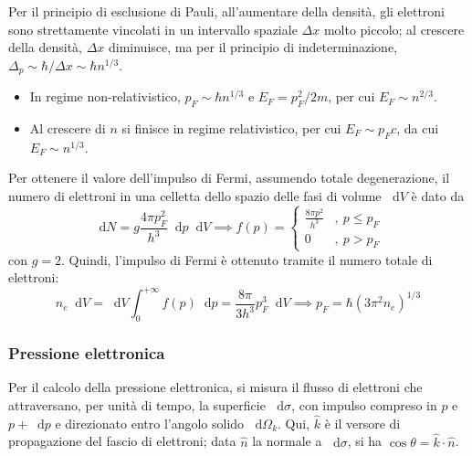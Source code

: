 \documentclass[11pt, a4paper]{scrartcl}
\theoremstyle{style}
\theoremstyle{style1}
\newcommand{\dd}{\mathop{}\!\mathrm{d}}
\numberwithin{equation}{subsection}
\begin{document}
Per il principio di esclusione di Pauli, all'aumentare della densit\`a, gli elettroni sono strettamente vincolati in un intervallo spaziale $\Delta x$ molto piccolo; al crescere della densit\`a, $\Delta x$ diminuisce, ma per il principio di indeterminazione, $\Delta _p \sim \hbar / \Delta x \sim \hbar n^{1 / 3}$.
\begin{itemize}
	\item In regime non-relativistico, $p_F \sim \hbar  n^{1 / 3}$ e $E_F = p_F^2 / 2m$, per cui $E_F \sim n^{2 / 3}$.
	\item Al crescere di $n$ si finisce in regime relativistico, per cui $E_F \sim p_F c$, da cui $E_F \sim n^{1 / 3}$.
\end{itemize}
Per ottenere il valore dell'impulso di Fermi, assumendo totale degenerazione, il numero di elettroni in una celletta dello spazio delle fasi di volume $\dd V$ \`e dato da 
\[
\dd N = g\frac{4\pi p_F^2}{h^3} \dd p\dd V \implies f(p) = \begin{cases}
	\frac{8 \pi p^2}{h^3} &,\ p \le p_F\\
	0 &,\ p>p_F
\end{cases}
\] 
con $g=2$.
Quindi, l'impulso di Fermi \`e ottenuto tramite il numero totale di elettroni:
\[
n_e \dd V = \dd V \int _0^{+\infty} f(p) \dd p = \frac{8 \pi }{3 h^3}p^3_F \dd V \implies p_F = \hbar (3 \pi ^2 n_e )^{1 / 3}
\] 
\subsubsection{Pressione elettronica}
Per il calcolo della pressione elettronica, si misura il flusso di elettroni che attraversano, per unit\`a di tempo, la superficie $\dd \sigma $, con impulso compreso in $p$ e $p+\dd p$ e direzionato entro l'angolo solido $\dd \Omega _k$.
Qui, $\hat{k}$ \`e il versore di propagazione del fascio di elettroni; data $\hat{n}$ la normale a $\dd \sigma $, si ha $\cos \theta = \hat{k} \cdot \hat{n}$.
\end{document}
